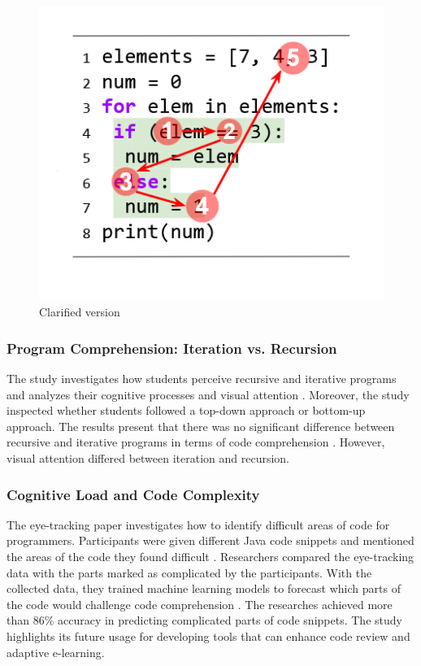 \begin{figure}
  \centering
  \includegraphics[scale=0.6]{figures/b.png}
  \caption{Clarified version \citet{silva2023evaluating}}
  \label{fig:AnhangsChor}
\end{figure}


\subsubsection{Program Comprehension: Iteration vs. Recursion} 
The study \citet{aroobaunderstanding} investigates how students perceive recursive and iterative programs and analyzes their cognitive processes and visual attention \citet{aroobaunderstanding}. Moreover, the study inspected whether students followed a top-down approach or bottom-up approach.
The results present that there was no significant difference between recursive and iterative programs in terms of code comprehension \citet{aroobaunderstanding}.  However, visual attention differed between iteration and recursion. 

\subsubsection{Cognitive Load and Code Complexity} 

The eye-tracking paper \citet{abbad2022estimating} investigates how to identify difficult areas of code for programmers.  Participants were given different Java code snippets and mentioned the areas of the code they found difficult \citet{abbad2022estimating}. Researchers compared the eye-tracking data with the parts marked as complicated by the participants. With the collected data, they trained machine learning models to forecast which parts of the code would challenge code comprehension \citet{abbad2022estimating}. The researches achieved more than 86\% accuracy in predicting complicated parts of code snippets. The study highlights its future usage for developing tools that can enhance code review and adaptive e-learning. 



